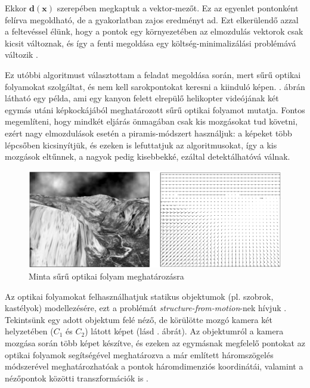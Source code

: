 Ekkor $\mathbf{d}(\mathbf{x})$ szerepében megkaptuk a vektor-mezőt. Ez az egyenlet pontonként felírva megoldható, de a gyakorlatban zajos eredményt ad. Ezt elkerülendő azzal a feltevéssel élünk, hogy a pontok egy környezetében az elmozdulás vektorok csak kicsit változnak, és így a fenti megoldása egy költség-minimalizálási problémává változik \cite{farneback}.

Ez utóbbi algoritmust \cite{opencv-lk} választottam a feladat megoldása során, mert sűrű optikai folyamokat szolgáltat, és nem kell sarokpontokat keresni a kiinduló képen. . ábrán látható egy példa, ami egy kanyon felett elrepülő helikopter videójának két egymás utáni képkockájából meghatározott sűrű optikai folyamot mutatja. Fontos megemlíteni, hogy mindkét eljárás önmagában csak kis mozgásokat tud követni, ezért nagy elmozdulások esetén a piramis-módszert használjuk: a képeket több lépcsőben kicsinyítjük, és ezeken is lefuttatjuk az algoritmusokat, így a kis mozgások eltűnnek, a nagyok pedig kisebbekké, ezáltal detektálhatóvá válnak.

\begin{figure}[tbh]
\centering
\includegraphics[width=420pt]{figures/farneback.png}
\caption{Minta sűrű optikai folyam meghatározásra \cite{farneback} \label{fig:dense-of}}
\end{figure}

Az optikai folyamokat felhasználhatjuk statikus objektumok (pl. szobrok, kastélyok) modellezésére, ezt a problémát \textit{structure-from-motion}-nek hívjuk \cite{sfm}. Tekintsünk egy adott objektum felé néző, de körülötte mozgó kamera két helyzetében ($C_1$ és $C_2$) látott képet (lásd . ábrát). Az objektumról a kamera mozgása során több képet készítve, és ezeken az egymásnak megfelelő pontokat az optikai folyamok segítségével meghatározva a már említett háromszögelés módszerével meghatározhatóak a pontok háromdimenziós koordinátái, valamint a nézőpontok közötti transzformációk is \cite[4. fejezet]{book}.

